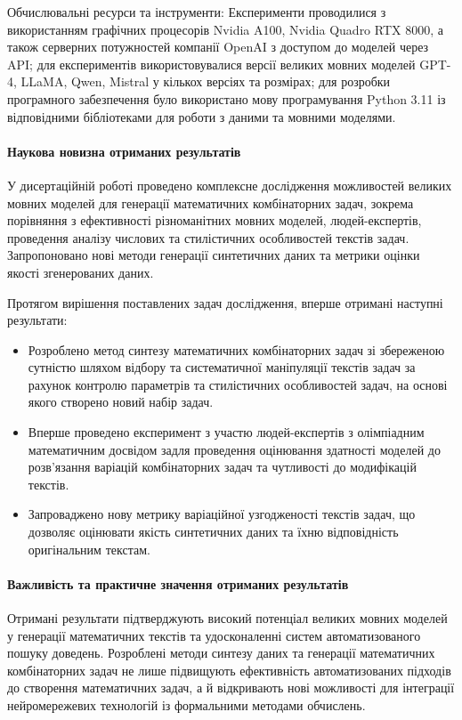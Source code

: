 Обчислювальні ресурси та інструменти: Експерименти проводилися з використанням графічних процесорів Nvidia A100, Nvidia Quadro RTX 8000, а також серверних потужностей компанії OpenAI з доступом до моделей через API; для експериментів використовувалися версії великих мовних моделей GPT-4, LLaMA, Qwen, Mistral у кількох версіях та розмірах; для розробки програмного забезпечення було використано мову програмування Python 3.11 із відповідними бібліотеками для роботи з даними та мовними моделями.

\medskip

\paragraph{Наукова новизна отриманих результатів}

У дисертаційній роботі проведено комплексне дослідження можливостей великих мовних моделей для генерації математичних комбінаторних задач, зокрема порівняння з ефективності різноманітних мовних моделей, людей-експертів, проведення аналізу числових та стилістичних особливостей текстів задач. Запропоновано нові методи генерації синтетичних даних та метрики оцінки якості згенерованих даних.

Протягом вирішення поставлених задач дослідження, вперше отримані наступні результати:
\begin{itemize}
    \item Розроблено метод синтезу математичних комбінаторних задач зі збереженою сутністю шляхом відбору та систематичної маніпуляції текстів задач за рахунок контролю параметрів та стилістичних особливостей задач, на основі якого створено новий набір задач.
    \item Вперше проведено експеримент з участю людей-експертів з олімпіадним математичним досвідом задля проведення оцінювання здатності моделей до розв'язання варіацій комбінаторних задач та чутливості до модифікацій текстів.
    \item Запроваджено нову метрику варіаційної узгодженості текстів задач, що дозволяє оцінювати якість синтетичних даних та їхню відповідність оригінальним текстам.
\end{itemize}

\paragraph{Важливість та практичне значення отриманих результатів}

Отримані результати підтверджують високий потенціал великих мовних моделей у генерації математичних текстів та удосконаленні систем автоматизованого пошуку доведень. Розроблені методи синтезу даних та генерації математичних комбінаторних задач не лише підвищують ефективність автоматизованих підходів до створення математичних задач, а й відкривають нові можливості для інтеграції нейромережевих технологій із формальними методами обчислень.

